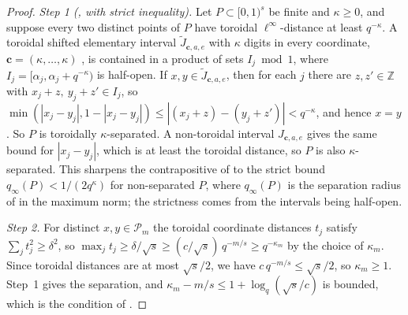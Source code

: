 \documentclass[11pt]{amsart}
\theoremstyle{definition}
\theoremstyle{plain}
\newcommand{\Z}{\mathbb{Z}}
\begin{document}
\begin{proof}
\emph{Step 1 (\cite[Lemma~3.7]{DGS2}, with strict inequality).} Let $P\subset[0,1)^s$ be finite and $\kappa\ge0$, and suppose every two distinct points of $P$ have toroidal $\ell^\infty$-distance at least $q^{-\kappa}$. A toroidal shifted elementary interval $\tilde J_{\mathbf c,a,e}$ with $\kappa$ digits in every coordinate, $\mathbf c=(\kappa,\dots,\kappa)$ \cite[Def.~3.2]{DGS2}, is contained in a product of sets $I_j\bmod1$, where $I_j=[\alpha_j,\alpha_j+q^{-\kappa})$ is half-open. If $x,y\in\tilde J_{\mathbf c,a,e}$, then for each $j$ there are $z,z'\in\Z$ with $x_j+z,\ y_j+z'\in I_j$, so $\min(|x_j-y_j|,1-|x_j-y_j|)\le|(x_j+z)-(y_j+z')|<q^{-\kappa}$, and hence $x=y$. So $P$ is toroidally $\kappa$-separated. A non-toroidal interval $J_{\mathbf c,a,e}$ gives the same bound for $|x_j-y_j|$, which is at least the toroidal distance, so $P$ is also $\kappa$-separated. This sharpens the contrapositive of \cite[Lemma~3.7]{DGS2} to the strict bound $q_\infty(P)<1/(2q^\kappa)$ for non-separated $P$, where $q_\infty(P)$ is the separation radius of \cite{DGS2} in the maximum norm; the strictness comes from the intervals being half-open.

\emph{Step 2.} For distinct $x,y\in\mathcal P_m$ the toroidal coordinate distances $t_j$ satisfy $\sum_jt_j^2\ge\delta^2$, so $\max_jt_j\ge\delta/\sqrt s\ge(c/\sqrt s)\,q^{-m/s}\ge q^{-\kappa_m}$ by the choice of $\kappa_m$. Since toroidal distances are at most $\sqrt s/2$, we have $c\,q^{-m/s}\le\sqrt s/2$, so $\kappa_m\ge1$. Step~1 gives the separation, and $\kappa_m-m/s\le1+\log_q(\sqrt s/c)$ is bounded, which is the condition of \cite[Def.~3.8]{DGS2}.


\end{proof}
\end{document}
